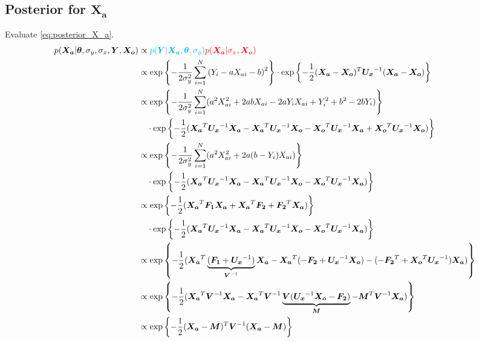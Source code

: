 \documentclass[10pt]{article}
\renewcommand{\vec}[1]{\boldsymbol{#1}}
\newcommand{\mat}[1]{\boldsymbol{#1}}
\begin{document}
\subsection{Posterior for $\vec{X_a}$}
Evaluate \cref{eq:posterior_X_a}.
\begin{align}
    p(\vec{X_a} | \vec{\theta}, \sigma_y, \sigma_x, \vec{Y}, \vec{X_o}) &\propto {\color{cyan} p(\vec{Y} | \vec{X_a}, \vec{\theta}, \sigma_y)} {\color{red} p(\vec{X_a} | \sigma_x, \vec{X_o})} \\
    &\propto \exp\left\{ - \frac{1}{2\sigma_y^2} \sum_{i=1}^N \left( Y_i - a X_{ai} - b \right)^2 \right\} \cdot \exp\left\{ - \frac{1}{2} (\vec{X_a} - \vec{X_o})^T \mat{U_x}^{-1} (\vec{X_a} - \vec{X_o}) \right\} \\
    
    &\propto \exp\left\{ - \frac{1}{2\sigma_y^2} \sum_{i=1}^N (a^2 X_{ai}^2  + 2 a b X_{ai} - 2 a Y_i X_{ai} + Y_i^2 + b^2 -2 b Y_i) \right\} \nonumber \\
    &\quad \cdot \exp\left\{ - \frac{1}{2} ( \vec{X_a}^T \mat{U_x}^{-1} \vec{X_a} - \vec{X_a}^T \mat{U_x}^{-1} \vec{X_o} -\vec{X_o}^T \mat{U_x}^{-1} \vec{X_a} + \vec{X_o}^T \mat{U_x}^{-1} \vec{X_o} ) \right\} \\
    
    &\propto \exp\left\{ - \frac{1}{2\sigma_y^2} \sum_{i=1}^N (a^2 X_{ai}^2  + 2 a (b - Y_i) X_{ai} ) \right\} \nonumber \\
    &\quad \cdot \exp\left\{ - \frac{1}{2} ( \vec{X_a}^T \mat{U_x}^{-1} \vec{X_a} - \vec{X_a}^T \mat{U_x}^{-1} \vec{X_o} -\vec{X_o}^T \mat{U_x}^{-1} \vec{X_a}) \right\} \\
    
    &\propto \exp\left\{ - \frac{1}{2} (\vec{X_a}^T \mat{F_1} \vec{X_a} + \vec{X_a}^T \vec{F_2} + \vec{F_2}^T \vec{X_a}) \right\} \nonumber \\
    &\quad \cdot \exp\left\{ - \frac{1}{2} ( \vec{X_a}^T \mat{U_x}^{-1} \vec{X_a} - \vec{X_a}^T \mat{U_x}^{-1} \vec{X_o} -\vec{X_o}^T \mat{U_x}^{-1} \vec{X_a}) \right\} \\
    
    &\propto \exp\left\{ - \frac{1}{2} (\vec{X_a}^T \underbrace{(\mat{F_1} + \mat{U_x}^{-1})}_{\mat{V}^{-1}} \vec{X_a} - \vec{X_a}^T (- \vec{F_2} + \mat{U_x}^{-1} \vec{X_o}) - (- \vec{F_2}^T + \vec{X_o}^T \mat{U_x}^{-1}) \vec{X_a}) \right\} \\
    
    &\propto \exp\left\{ - \frac{1}{2} (\vec{X_a}^T \mat{V}^{-1} \vec{X_a} - \vec{X_a}^T \mat{V}^{-1} \underbrace{\mat{V} (\mat{U_x}^{-1} \vec{X_o} - \vec{F_2}) }_{\vec{M}} - \vec{M}^T \mat{V}^{-1} \vec{X_a}) \right\} \\
    
    &\propto \exp\left\{ - \frac{1}{2} (\vec{X_a} - \vec{M})^T \mat{V}^{-1} (\vec{X_a} - \vec{M}) \right\}  \label{eq:posterior_Xa}

\end{align}
\end{document}
